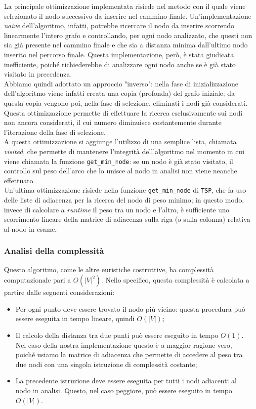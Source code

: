 La principale ottimizzazione implementata risiede nel metodo con il quale viene selezionato il nodo successivo da inserire nel cammino finale. Un'implementazione \textit{naive} dell'algoritmo, infatti, potrebbe ricercare il nodo da inserire scorrendo linearmente l'intero grafo e controllando, per ogni nodo analizzato, che questi non sia già presente nel cammino finale e che sia a distanza minima dall'ultimo nodo inserito nel percorso finale. Questa implementazione, però, è stata giudicata inefficiente, poiché richiederebbe di analizzare ogni nodo anche se è già stato visitato in precedenza. \\
Abbiamo quindi adottato un approccio "inverso": nella fase di inizializzazione dell'algoritmo viene infatti creata una copia (profonda) del grafo iniziale; da questa copia vengono poi, nella fase di selezione, eliminati i nodi già considerati. Questa ottimizzazione permette di effettuare la ricerca esclusivamente sui nodi non ancora considerati, il cui numero diminuisce costantemente durante l'iterazione della fase di selezione. \\
A questa ottimizzazione si aggiunge l'utilizzo di una semplice lista, chiamata \textit{visited}, che permette di mantenere l'integrità dell'algoritmo nel momento in cui viene chiamata la funzione \texttt{get\_min\_node}: se un nodo è già stato visitato, il controllo sul peso dell'arco che lo unisce al nodo in analisi non viene neanche effettuato. \\
Un'ultima ottimizzazione risiede nella funzione \texttt{get\_min\_node} di \texttt{TSP}, che fa uso delle liste di adiacenza per la ricerca del nodo di peso minimo; in questo modo, invece di calcolare a \textit{runtime} il peso tra un nodo e l'altro, è sufficiente uno scorrimento lineare della matrice di adiacenza sulla riga (o sulla colonna) relativa al nodo in esame.

\subsubsection{Analisi della complessità}

Questo algoritmo, come le altre euristiche costruttive, ha complessità computazionale pari a $O(|V|^2)$. Nello specifico, questa complessità è calcolata a partire dalle seguenti considerazioni:
\begin{itemize}
    \item Per ogni punto deve essere trovato il nodo più vicino: questa procedura può essere eseguita in tempo lineare, quindi $O(|V|)$;
    \item Il calcolo della distanza tra due punti può essere eseguito in tempo $O(1)$. Nel caso della nostra implementazione questo è a maggior ragione vero, poiché usiamo la matrice di adiacenza che permette di accedere al peso tra due nodi con una singola istruzione di complessità costante;
    \item La precedente istruzione deve essere eseguita per tutti i nodi adiacenti al nodo in analisi. Questo, nel caso peggiore, può essere eseguito in tempo $O(|V|)$.
\end{itemize}

